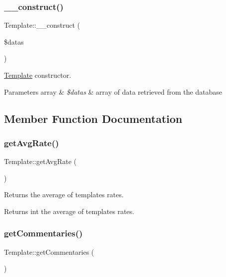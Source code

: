 \subsubsection{\texorpdfstring{\+\_\+\+\_\+construct()}{\_\_construct()}}
{\footnotesize\ttfamily Template\+::\+\_\+\+\_\+construct (\begin{DoxyParamCaption}\item[{}]{\$datas }\end{DoxyParamCaption})}

\hyperlink{classTemplate}{Template} constructor. 
\begin{DoxyParams}[1]{Parameters}
array & {\em \$datas} & array of data retrieved from the database \\
\hline
\end{DoxyParams}


\subsection{Member Function Documentation}
\mbox{\label{classTemplate_abc14756682dcf97f7fb809d9a006ea7f}} 
\subsubsection{\texorpdfstring{get\+Avg\+Rate()}{getAvgRate()}}
{\footnotesize\ttfamily Template\+::get\+Avg\+Rate (\begin{DoxyParamCaption}{ }\end{DoxyParamCaption})}

Returns the average of template\textquotesingle{}s rates. \begin{DoxyReturn}{Returns}
int the average of template\textquotesingle{}s rates. 
\end{DoxyReturn}
\mbox{\label{classTemplate_ac33cd0391843f7ace26c7302937ed222}} 
\subsubsection{\texorpdfstring{get\+Commentaries()}{getCommentaries()}}
{\footnotesize\ttfamily Template\+::get\+Commentaries (\begin{DoxyParamCaption}{ }\end{DoxyParamCaption})}

